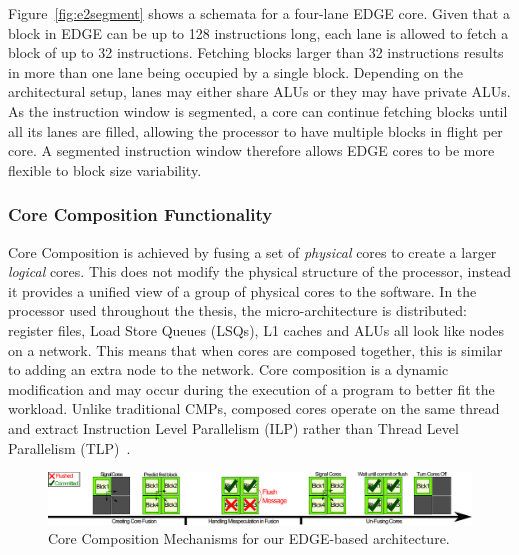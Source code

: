 Figure~\ref{fig:e2segment} shows a schemata for a four-lane EDGE core.
Given that a block in EDGE can be up to 128 instructions long, each lane is allowed to fetch a block of up to 32 instructions.
Fetching blocks larger than 32 instructions results in more than one lane being occupied by a single block.
Depending on the architectural setup, lanes may either share ALUs or they may have private ALUs.
As the instruction window is segmented, a core can continue fetching blocks until all its lanes are filled, allowing the processor to have multiple blocks in flight per core.
A segmented instruction window therefore allows EDGE cores to be more flexible to block size variability.

\subsubsection{Core Composition Functionality}\label{chp:Background:sec:EDGE}

Core Composition is achieved by fusing a set of \textit{physical} cores to create a larger \textit{logical} cores.
This does not modify the physical structure of the processor, instead it provides a unified view of a group of physical cores to the software.
In the processor used throughout the thesis, the micro-architecture is distributed: register files, Load Store Queues (LSQs), L1 caches and ALUs all look like nodes on a network.
This means that when cores are composed together, this is similar to adding an extra node to the network.
Core composition is a dynamic modification and may occur during the execution of a program to better fit the workload.
Unlike traditional CMPs, composed cores operate on the same thread and extract Instruction Level Parallelism (ILP) rather than Thread Level Parallelism (TLP)~\cite{micolet2016dmpstream,pricopi2012bahurupi}.

\begin{figure}
 \center
 \includegraphics[width=1\textwidth]{cases-paper/graphics/background/proc_test.pdf}
 \caption{Core Composition Mechanisms for our EDGE-based architecture.}\label{fig:dmp}
 \end{figure}
 
